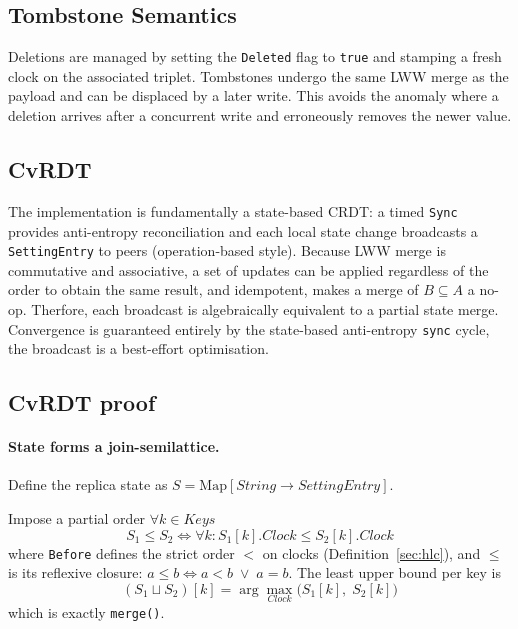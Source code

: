 \documentclass[conference]{IEEEtran}
\begin{document}
\subsection{Tombstone Semantics}

Deletions are {\color{violet}managed by setting the \texttt{Deleted} flag to \texttt{true}
and stamping a fresh clock on the associated triplet}. Tombstones undergo the same LWW merge as the payload and
can be displaced by a later write. This avoids the anomaly where a deletion
arrives after a concurrent write and erroneously removes the newer value.

\subsection{CvRDT}

The implementation is {\color{violet}fundamentally a state-based CRDT: a timed
  \texttt{Sync} provides anti-entropy reconciliation and each local state change broadcasts a
  \texttt{SettingEntry} to peers (operation-based style).
  Because LWW merge is commutative and associative, a set of updates can be applied regardless of the order to obtain the same result,
and idempotent, makes a merge of $B\subseteq A$ a no-op. Therfore,} each broadcast is algebraically
equivalent to a partial state merge. Convergence is guaranteed
entirely by the state-based anti-entropy \texttt{sync} cycle, the broadcast is a best-effort optimisation.

\subsection{CvRDT proof}
\label{sec:cvrdtproof}

\paragraph{State forms a join-semilattice.}
Define the replica state as $S = \mathrm{Map}[\mathit{String} \to
\mathit{SettingEntry}]$.

\noindent Impose a partial order $\forall k \in Keys$
\begin{equation}
  S_1 \leq S_2 \iff \forall k: S_1[k].\mathit{Clock} \leq S_2[k].\mathit{Clock}
\end{equation}
where \texttt{Before} defines the strict order $<$ on clocks (Definition~\ref{sec:hlc}),
and $\leq$ is its reflexive closure: $a \leq b \iff a < b \;\lor\; a = b$.
The least upper bound per key is
\begin{equation}
  (S_1 \sqcup S_2)[k] = \arg\max_{\mathit{Clock}}\bigl(S_1[k],\; S_2[k]\bigr)
\end{equation}
which is exactly \texttt{merge()}.
\end{document}
